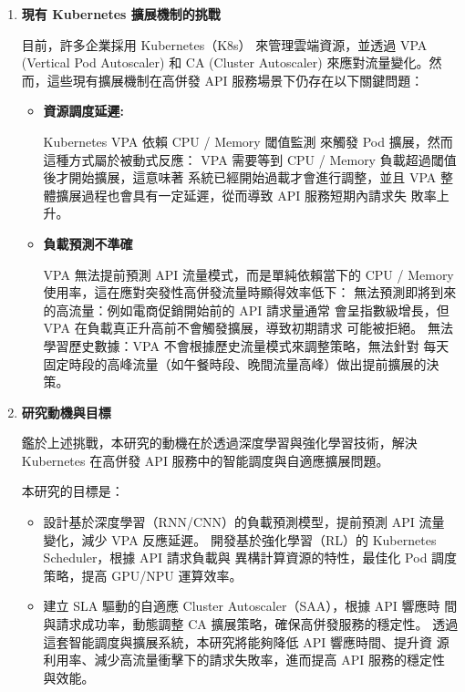 \documentclass[12pt,a4paper]{article}
\begin{document}
\begin{enumerate}[label={(\zhdig*)}, leftmargin=2\parindent, listparindent=\parindent]
\begin{enumerate}[label={(\arabic*)}, leftmargin=\parindent, listparindent=\parindent]
\item\textbf{現有 Kubernetes 擴展機制的挑戰\cite{7}}

目前，許多企業採用 Kubernetes（K8s） 來管理雲端資源，並透過 VPA
(Vertical Pod Autoscaler) 和 CA (Cluster Autoscaler) 來應對流量變化。然
而，這些現有擴展機制在高併發 API 服務場景下仍存在以下關鍵問題：
\begin{itemize}[leftmargin=\parindent, listparindent=\parindent]
    \item\textbf{資源調度延遲:}

Kubernetes VPA 依賴 CPU / Memory 閾值監測 來觸發 Pod 擴展，然而
這種方式屬於被動式反應：
VPA 需要等到 CPU / Memory 負載超過閾值後才開始擴展，這意味著
系統已經開始過載才會進行調整，並且 VPA 整體擴展過程也會具有一定延遲，從而導致 API 服務短期內請求失
敗率上升。

    \item \textbf{
負載預測不準確
}

VPA 無法提前預測 API 流量模式，而是單純依賴當下的 CPU /
Memory 使用率，這在應對突發性高併發流量時顯得效率低下：
無法預測即將到來的高流量：例如電商促銷開始前的 API 請求量通常
會呈指數級增長，但 VPA 在負載真正升高前不會觸發擴展，導致初期請求
可能被拒絕。
無法學習歷史數據：VPA 不會根據歷史流量模式來調整策略，無法針對
每天固定時段的高峰流量（如午餐時段、晚間流量高峰）做出提前擴展的決
策。

    \end{itemize}
    \item \textbf{研究動機與目標}

鑑於上述挑戰，本研究的動機在於透過深度學習與強化學習技術，解決
Kubernetes 在高併發 API 服務中的智能調度與自適應擴展問題。

本研究的目標是：
\begin{itemize}[leftmargin=\parindent, listparindent=\parindent]

    \item 設計基於深度學習（RNN/CNN）的負載預測模型，提前預測 API 流量
變化，減少 VPA 反應延遲。
開發基於強化學習（RL）的 Kubernetes Scheduler，根據 API 請求負載與
異構計算資源的特性，最佳化 Pod 調度策略，提高 GPU/NPU 運算效率。

    \item 建立 SLA 驅動的自適應 Cluster Autoscaler（SAA），根據 API 響應時
間與請求成功率，動態調整 CA 擴展策略，確保高併發服務的穩定性。
透過這套智能調度與擴展系統，本研究將能夠降低 API 響應時間、提升資
源利用率、減少高流量衝擊下的請求失敗率，進而提高 API 服務的穩定性
與效能。
\end{itemize}


\end{enumerate}
\end{enumerate}
\end{document}
